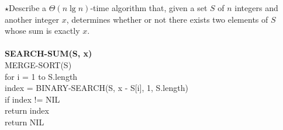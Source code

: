 \documentclass{article}
\begin{document}
\noindent  $\star$Describe a $\Theta(n\lg{n})$-time algorithm that, given a set $S$ of $n$
integers and another integer $x$, determines whether or not there exists two
elements of $S$ whose sum is exactly $x$.\\\\
\noindent\textbf{SEARCH-SUM(S, x)}\\
\indent MERGE-SORT(S)\\
\indent for i = 1 to S.length\\
\indent\indent index = BINARY-SEARCH(S, x - S[i], 1, S.length)\\
\indent\indent if index != NIL\\
\indent\indent\indent return index\\
\indent return NIL
\end{document}
